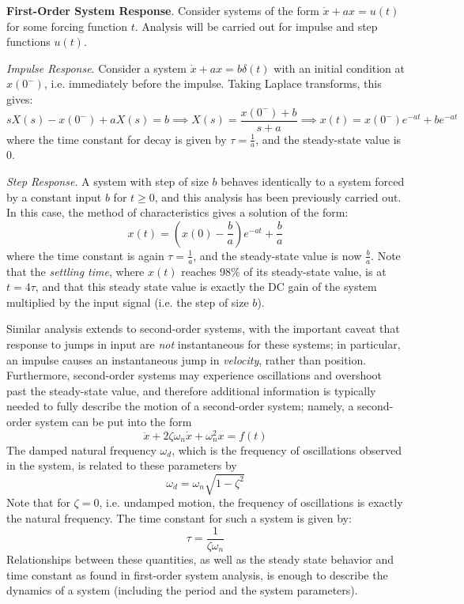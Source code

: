 \begin{framed}
    \textbf{First-Order System Response}. Consider systems of the form $\dot x + a x = u(t)$ for some forcing function $t$. Analysis will be carried out for impulse and step functions $u(t)$.

    \textit{Impulse Response}. Consider a system $\dot x + a x = b\delta(t)$ with an initial condition at $x(0^-)$, i.e. immediately before the impulse. Taking Laplace transforms, this gives: \[sX(s) - x(0^-) + a X(s) = b \implies X(s) = \frac{x(0^-) + b}{s+a} \implies \boxed{x(t) = x(0^-) e^{-at} + be^{-at}}\] where the time constant for decay is given by $\tau = \frac{1}{a}$, and the steady-state value is $0$.

    \textit{Step Response}. A system with step of size $b$ behaves identically to a system forced by a constant input $b$ for $t\geq 0$, and this analysis has been previously carried out. In this case, the method of characteristics gives a solution of the form: \[\boxed{x(t) = \left(x(0) - \frac{b}{a}\right) e^{-at} + \frac{b}{a}}\] where the time constant is again $\tau = \frac{1}{a}$, and the steady-state value is now $\frac{b}{a}$. Note that the \textit{settling time}, where $x(t)$ reaches $98\%$ of its steady-state value, is at $t=4\tau$, and that this steady state value is exactly the DC gain of the system multiplied by the input signal (i.e. the step of size $b$).
\end{framed}

Similar analysis extends to second-order systems, with the important caveat that response to jumps in input are \textit{not} instantaneous for these systems; in particular, an impulse causes an instantaneous jump in \textit{velocity}, rather than position. Furthermore, second-order systems may experience oscillations and overshoot past the steady-state value, and therefore additional information is typically needed to fully describe the motion of a second-order system; namely, a second-order system can be put into the form \[\ddot x + 2\zeta\omega_n \dot x + \omega_n^2 x = f(t)\] The damped natural frequency $\omega_d$, which is the frequency of oscillations observed in the system, is related to these parameters by \[\omega_d = \omega_n \sqrt{1-\zeta^2}\] Note that for $\zeta=0$, i.e. undamped motion, the frequency of oscillations is exactly the natural frequency. The time constant for such a system is given by: \[\tau = \frac{1}{\zeta\omega_n}\] Relationships between these quantities, as well as the steady state behavior and time constant as found in first-order system analysis, is enough to describe the dynamics of a system (including the period and the system parameters). 

